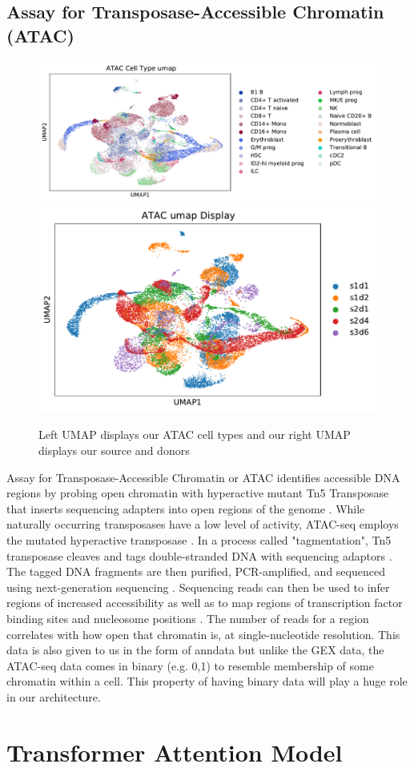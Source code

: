 \subsection{Assay for Transposase-Accessible Chromatin (ATAC)}

\begin{figure}[H]
\centering
\includegraphics[width=.5\textwidth]{figures/umap_ATAC_ct.pdf}
\includegraphics[width=.35\textwidth]{figures/umap_ATAC.pdf}
\caption{Left UMAP displays our ATAC cell types and our right UMAP displays our source and donors}
\end{figure}

Assay for Transposase-Accessible Chromatin or ATAC identifies accessible DNA regions by probing open chromatin with hyperactive mutant Tn5 Transposase that inserts sequencing adapters into open regions of the genome \cite{six}. 
While naturally occurring transposases have a low level of activity, ATAC-seq employs the mutated hyperactive transposase \cite{seven}. 
In a process called "tagmentation", Tn5 transposase cleaves and tags double-stranded DNA with sequencing adaptors \cite{eight}. 
The tagged DNA fragments are then purified, PCR-amplified, and sequenced using next-generation sequencing \cite{eight}.
Sequencing reads can then be used to infer regions of increased accessibility as well as to map regions of transcription factor binding sites and nucleosome positions \cite{six}. 
The number of reads for a region correlates with how open that chromatin is, at single-nucleotide resolution.
This data is also given to us in the form of anndata but unlike the GEX data, the ATAC-seq data comes in binary (e.g. 0,1) to resemble membership of some chromatin within a cell. This property of having binary data will play a huge role in our architecture.

\section{Transformer Attention Model}

